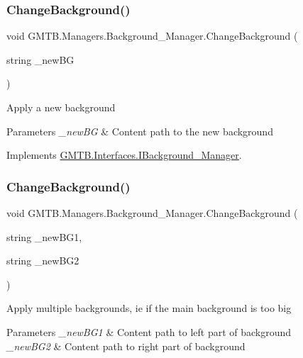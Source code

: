 \subsubsection{\texorpdfstring{ChangeBackground()}{ChangeBackground()}\hspace{0.1cm}{\footnotesize\ttfamily [1/2]}}
{\footnotesize\ttfamily void G\+M\+T\+B.\+Managers.\+Background\+\_\+\+Manager.\+Change\+Background (\begin{DoxyParamCaption}\item[{string}]{\+\_\+new\+BG }\end{DoxyParamCaption})}



Apply a new background 


\begin{DoxyParams}{Parameters}
{\em \+\_\+new\+BG} & Content path to the new background \\
\hline
\end{DoxyParams}


Implements \mbox{\hyperlink{interface_g_m_t_b_1_1_interfaces_1_1_i_background___manager}{G\+M\+T\+B.\+Interfaces.\+I\+Background\+\_\+\+Manager}}.

\mbox{\label{class_g_m_t_b_1_1_managers_1_1_background___manager_a71e24c2d23e5a495178ffb5b5dd27a41}} 
\subsubsection{\texorpdfstring{ChangeBackground()}{ChangeBackground()}\hspace{0.1cm}{\footnotesize\ttfamily [2/2]}}
{\footnotesize\ttfamily void G\+M\+T\+B.\+Managers.\+Background\+\_\+\+Manager.\+Change\+Background (\begin{DoxyParamCaption}\item[{string}]{\+\_\+new\+B\+G1,  }\item[{string}]{\+\_\+new\+B\+G2 }\end{DoxyParamCaption})}



Apply multiple backgrounds, ie if the main background is too big 


\begin{DoxyParams}{Parameters}
{\em \+\_\+new\+B\+G1} & Content path to left part of background \\
\hline
{\em \+\_\+new\+B\+G2} & Content path to right part of background \\
\hline
\end{DoxyParams}


